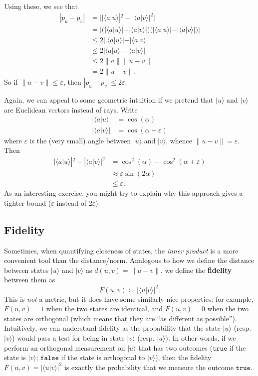 \documentclass[fleqn]{article}
\begin{document}
Using these, we see that
\[
  \begin{aligned}
    |p_u-p_v|
    &= \Big| |\langle a|u\rangle|^2 - |\langle a|v\rangle|^2 \Big|
  \\&= \Big| \Big( |\langle a|u\rangle| + |\langle a|v\rangle| \Big) \Big( |\langle a|u\rangle| - |\langle a|v\rangle| \Big) \Big|
  \\&\leqslant 2\Big| |\langle a|u\rangle| - |\langle a|v\rangle| \Big|
  \\&\leqslant 2\Big| \langle a|u\rangle - \langle a|v\rangle \Big|
  \\&\leqslant 2\|a\|\|u-v\|
  \\&= 2\|u-v\|.
  \end{aligned}
\]
So if \(\|u-v\|\leqslant\varepsilon\), then \(|p_u-p_v|\leqslant 2\varepsilon\).

Again, we can appeal to some geometric intuition if we pretend that \(|u\rangle\) and \(|v\rangle\) are Euclidean vectors instead of rays.
Write
\[
  \begin{aligned}
    |\langle a|u\rangle| &= \cos(\alpha)
  \\|\langle a|v\rangle| &= \cos(\alpha+\varepsilon)
  \end{aligned}
\]
where \(\varepsilon\) is the (very small) angle between \(|u\rangle\) and \(|v\rangle\), whence \(\|u-v\|=\varepsilon\).
Then
\[
  \begin{aligned}
    |\langle a|u\rangle|^2 - |\langle a|v\rangle|^2
    &= \cos^2(\alpha) - \cos^2(\alpha+\varepsilon)
  \\&\approx \varepsilon\sin(2\alpha)
  \\&\leqslant\varepsilon.
  \end{aligned}
\]
As an interesting exercise, you might try to explain why this approach gives a tighter bound (\(\varepsilon\) instead of \(2\varepsilon\)).

\hypertarget{fidelity}{%
\subsection{Fidelity}\label{fidelity}}

Sometimes, when quantifying closeness of states, the \emph{inner product} is a more convenient tool than the distance/norm.
Analogous to how we define the distance between states \(|u\rangle\) and \(|v\rangle\) as \(d(u,v)=\|u-v\|\), we define the \textbf{fidelity} between them as
\[
  F(u,v)\coloneqq |\langle u|v\rangle|^2.
\]
This is \emph{not} a metric, but it does have some similarly nice properties: for example, \(F(u,v)=1\) when the two states are identical, and \(F(u,v)=0\) when the two states are orthogonal (which means that they are ``as different as possible'').
Intuitively, we can understand fidelity as the probability that the state \(|u\rangle\) (resp. \(|v\rangle\)) would pass a test for being in state \(|v\rangle\) (resp. \(|u\rangle\)).
In other words, if we perform an orthogonal measurement on \(|u\rangle\) that has two outcomes (\(\texttt{true}\) if the state is \(|v\rangle\); \(\texttt{false}\) if the state is orthogonal to \(|v\rangle\)), then the fidelity \(F(u,v)=|\langle u|v\rangle|^2\) is exactly the probability that we measure the outcome \(\texttt{true}\).
\end{document}
